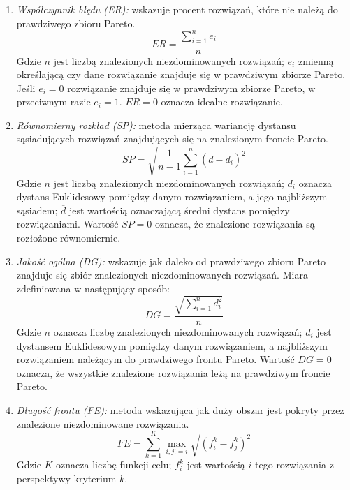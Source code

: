 \documentclass[twoside]{iisthesis}
\begin{document}
\begin{enumerate}
	\item \textit{Współczynnik błędu (ER):} wskazuje procent rozwiązań, które nie należą do prawdziwego zbioru Pareto.
	\begin{equation}
		ER = \dfrac{\sum_{i=1}^{n} e_{i}}{n}
	\end{equation}
	Gdzie $n$ jest liczbą znalezionych niezdominowanych rozwiązań; $e_{i}$ zmienną określającą czy dane rozwiązanie znajduje się w prawdziwym zbiorze Pareto. Jeśli $e_{i} = 0$ rozwiązanie znajduje się w prawdziwym zbiorze Pareto, w przeciwnym razie $e_{i} = 1$. $ER = 0$ oznacza idealne rozwiązanie.\\
	\item \textit{Równomierny rozkład (SP):} metoda mierząca wariancję dystansu sąsiadujących rozwiązań znajdujących się na znalezionym froncie Pareto.
	\begin{equation}
		SP = \sqrt{\dfrac{1}{n-1}\sum_{i=1}^{n}{(\overline{d} - d_{i})}^{2}}
	\end{equation}
	Gdzie $n$ jest liczbą znalezionych niezdominowanych rozwiązań; $d_{i}$ oznacza dystans Euklidesowy pomiędzy danym rozwiązaniem, a jego najbliższym sąsiadem; $\overline{d}$ jest wartością oznaczającą średni dystans pomiędzy rozwiązaniami. Wartość $SP = 0$ oznacza, że znalezione rozwiązania są rozłożone równomiernie.\\
	\item \textit{Jakość ogólna (DG):}  wskazuje jak daleko od prawdziwego zbioru Pareto znajduje się zbiór znalezionych niezdominowanych rozwiązań. Miara zdefiniowana w następujący sposób:
	\begin{equation}
		DG = \dfrac{\sqrt{\sum_{i=1}^{n} d_{i}^{2}}}{n}
	\end{equation}
	Gdzie $n$ oznacza liczbę znalezionych niezdominowanych rozwiązań; $d_{i}$ jest dystansem Euklidesowym pomiędzy danym rozwiązaniem, a najbliższym rozwiązaniem należącym do prawdziwego frontu Pareto. Wartość $DG = 0$ oznacza, że wszystkie znalezione rozwiązania leżą na prawdziwym froncie Pareto.\\
	\item \textit{Długość frontu (FE):} metoda wskazująca jak duży obszar jest pokryty przez znalezione niezdominowane rozwiązania.
	\begin{equation}
		FE = \sum_{k=1}^{K} \max_{i, j!=i} \sqrt{(f_{i}^{k} - f_{j}^{k})^{2}}
	\end{equation}
	Gdzie $K$ oznacza liczbę funkcji celu; $f_{i}^{k}$ jest wartością $i$-tego rozwiązania z perspektywy kryterium $k$.\\
\end{enumerate}
\end{document}
